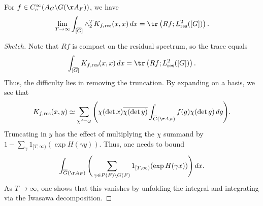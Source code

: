 \documentclass{article}
\begin{document}
\begin{lemma}
	For $f\in C_c^\infty(A_G\backslash G(\AA_F))$, we have
	\[\lim_{T\to\infty}\int_{[\overline G]}\land^T_2K_{f,\mathrm{res}}(x,x)\,dx=\tr\left(Rf;L^2_{\mathrm{res}}([G])\right).\]
\end{lemma}
\begin{proof}[Sketch]
	Note that $Rf$ is compact on the residual spectrum, so the trace equals
	\[\int_{[\overline G]}K_{f,\mathrm{res}}(x,x)\,dx=\tr\left(Rf;L^2_{\mathrm{res}}([G])\right).\]
	Thus, the difficulty lies in removing the truncation. By expanding on a basis, we see that
	\[K_{f,\mathrm{res}}(x,y)\simeq\sum_{\chi^2=\omega}\Bigg(\chi(\det x)\overline{\chi(\det y)}\int_{\overline G(\AA_F)}f(g)\chi(\det g)\,dg\Bigg).\]
	Truncating in $y$ has the effect of multiplying the $\chi$ summand by $1-\sum_{\gamma}1_{[T,\infty)}(\exp H(\gamma y))$. Thus, one needs to bound
	\[\int_{\overline G(\AA_F)}\Bigg(\sum_{\gamma\in P(F)\backslash G(F)}1_{[T,\infty)}(\exp H(\gamma x))\Bigg)\,dx.\]
	As $T\to\infty$, one shows that this vanishes by unfolding the integral and integrating via the Iwasawa decomposition.
\end{proof}
\end{document}

